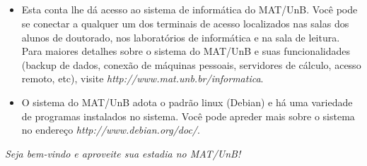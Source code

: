 \documentclass[11pt,portuguese,a4paper]{article}
\begin{document}

\vspace{12pt}

\\

\\
\\

\vspace{12pt}

\\

\small 

\vspace{-12pt}

\begin{itemize}

\item Esta conta lhe dá acesso ao sistema de informática do MAT/UnB. Você pode se conectar a qualquer um dos terminais de acesso localizados nas salas dos alunos de doutorado, nos laboratórios de informática e na sala de leitura. Para maiores detalhes sobre o sistema do MAT/UnB e suas funcionalidades (backup de dados, conexão de máquinas pessoais, servidores de cálculo, acesso remoto, etc), visite {\it http://www.mat.unb.br/informatica}. 

\item O sistema do MAT/UnB adota o padrão linux (Debian) e há uma variedade de programas instalados no sistema. Você pode apreder mais sobre o sistema no endereço {\it http://www.debian.org/doc/}. 

\end{itemize}

\begin{flushright}
{\it Seja bem-vindo e aproveite sua estadia no MAT/UnB!}
\end{flushright}
\end{document}
